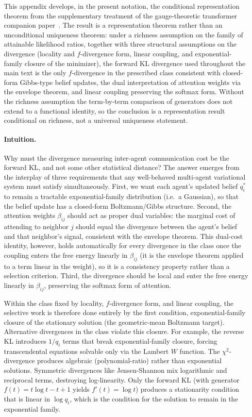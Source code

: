 \documentclass[11pt]{article}
\begin{document}
This appendix develops, in the present notation, the conditional representation theorem from the supplementary treatment of the gauge-theoretic transformer companion paper~\cite{Dennis2025trans}. The result is a representation theorem rather than an unconditional uniqueness theorem: under a richness assumption on the family of attainable likelihood ratios, together with three structural assumptions on the divergence (locality and $f$-divergence form, linear coupling, and exponential-family closure of the minimizer), the forward KL divergence used throughout the main text is the only $f$-divergence in the prescribed class consistent with closed-form Gibbs-type belief updates, the dual interpretation of attention weights via the envelope theorem, and linear coupling preserving the softmax form. Without the richness assumption the term-by-term comparison of generators does not extend to a functional identity, so the conclusion is a representation result conditional on richness, not a universal uniqueness statement.

\paragraph{Intuition.}
Why must the divergence measuring inter-agent communication cost be the forward KL, and not some other statistical distance? The answer emerges from the interplay of three requirements that any well-behaved multi-agent variational system must satisfy simultaneously. First, we want each agent's updated belief $q_i^*$ to remain a tractable exponential-family distribution (i.e.\ a Gaussian), so that the belief update has a closed-form Boltzmann/Gibbs structure. Second, the attention weights $\beta_{ij}$ should act as proper dual variables: the marginal cost of attending to neighbor $j$ should equal the divergence between the agent's belief and that neighbor's signal, consistent with the envelope theorem. This dual-cost identity, however, holds automatically for every divergence in the class once the coupling enters the free energy linearly in $\beta_{ij}$ (it is the envelope theorem applied to a term linear in the weight), so it is a consistency property rather than a selection criterion. Third, the divergence should be local and enter the free energy linearly in $\beta_{ij}$, preserving the softmax form of attention.

Within the class fixed by locality, $f$-divergence form, and linear coupling, the selective work is therefore done entirely by the first condition, exponential-family closure of the stationary solution (the geometric-mean Boltzmann target). Alternative divergences in the class violate this closure. For example, the reverse KL introduces $1/q_i$ terms that break exponential-family closure, forcing transcendental equations solvable only via the Lambert $W$ function. The $\chi^2$-divergence produces algebraic (polynomial-ratio) rather than exponential solutions. Symmetric divergences like Jensen-Shannon mix logarithmic and reciprocal terms, destroying log-linearity. Only the forward KL (with generator $f(t) = t\log t - t + 1$ yields $f'(t) = \log t$) produces a stationarity condition that is linear in $\log q_i$, which is the condition for the solution to remain in the exponential family.
\end{document}
